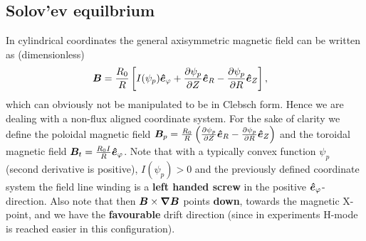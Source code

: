 \subsection{Solov'ev equilbrium}\label{sec:solovev}
In cylindrical coordinates the general axisymmetric  magnetic field can be written as (dimensionless)
\begin{align}
 {\boldsymbol{B}} &= \frac{R_0}{R}\left[I(\psi_p) \bm{\hat{e}}_{\varphi} + \frac{\partial
 \psi_p}{\partial Z} \bm{\hat{e}}_R -  \frac{\partial \psi_p}{\partial R} \bm{\hat{e}}_Z\right] ,
\end{align}
which can obviously not be manipulated to be in Clebsch form.
Hence we are dealing with a non-flux aligned coordinate system.
For the sake of clarity we define the poloidal magnetic field \( {\boldsymbol{B}}_p = \frac{R_0}{R}\left( \frac{\partial \psi_p}{\partial Z}\bm{\hat{e}}_R - \frac{\partial \psi_p}{\partial R}\bm{\hat{e}}_Z\right)
\) and the toroidal magnetic field \({\boldsymbol{B}}_t =\frac{R_0I}{R} \bm{\hat{e}}_{\varphi}\).
Note that with a typically convex function $\psi_p$ (second derivative is
positive), $I(\psi_p)>0$ and the previously defined coordinate system the field
line winding is a {\bf left handed screw} in the positive $\bm{\hat{e}}_\varphi$-direction.
Also note that then ${\boldsymbol{B}}\times{\boldsymbol{\nabla}}{\boldsymbol{B}}$ points {\bf down}, towards the magnetic X-point,
and we have the {\bf favourable} drift direction (since in experiments H-mode
is reached easier in this configuration).


